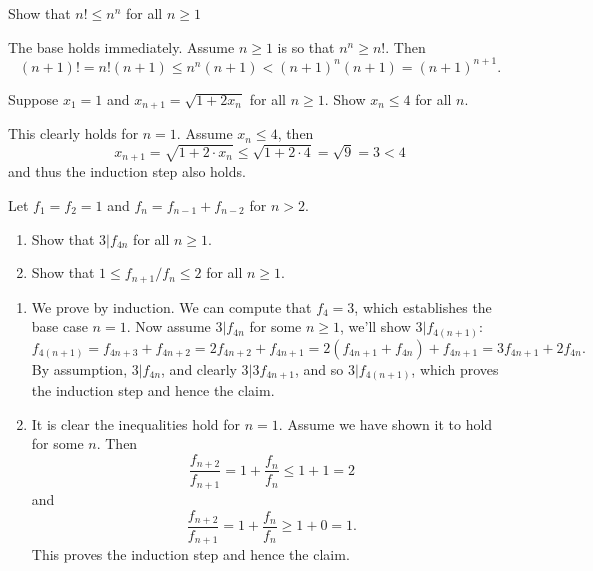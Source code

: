 \documentclass[11pt,dvipsnames]{book}
\numberwithin{equation}{section} %
\numberwithin{figure}{section} %
\numberwithin{table}{section} %
\begin{document}
\begin{exercise}
Show that $n!\leq n^{n}$ for all $n\geq 1$
\begin{solution}
The base holds immediately. Assume $n\geq 1$ is so that $n^{n}\geq n!$. Then
\[
(n+1)!=n! (n+1)\leq n^{n} (n+1)<(n+1)^{n}(n+1)=(n+1)^{n+1}.
\]
\end{solution}
\end{exercise}


\begin{exercise} Suppose $x_{1}=1$ and $x_{n+1} = \sqrt{1+2x_{n}}$ for all $n\geq 1$. Show $x_{n}\leq 4$ for all $n$. \\
\begin{solution}
This clearly holds for $n=1$. Assume $x_{n}\leq 4$, then 
\[
x_{n+1}= \sqrt{1+2\cdot x_{n}}\leq \sqrt{1+2\cdot 4}=\sqrt{9}=3<4\]
and thus the induction step also holds. 
\end{solution}
\end{exercise}

\begin{exercise}  Let $f_{1}=f_{2}=1$ and $f_{n}=f_{n-1}+f_{n-2}$ for $n>2$. 
\begin{enumerate}[label=(\alph*)]
\item Show that $3|f_{4n}$ for all $n\geq 1$. 
\item Show that $1\leq f_{n+1}/f_{n}\leq 2$ for all $n\geq 1$. 
\end{enumerate}

\begin{solution}
\begin{enumerate}[label=(\alph*)]
\item We prove by induction. We can compute that $f_{4}=3$, which establishes the base case $n=1$. Now assume $3|f_{4n}$ for some $n\geq 1$, we'll show $3|f_{4(n+1)}$:
\[
f_{4(n+1)}=f_{4n+3}+f_{4n+2}
=2f_{4n+2}+f_{4n+1}
=2(f_{4n+1}+f_{4n})+f_{4n+1}
=3f_{4n+1}+2f_{4n}.
\]
By assumption, $3|f_{4n}$, and clearly $3|3f_{4n+1}$, and so $3|f_{4(n+1)}$, which proves the induction step and hence the claim. 
\item It is clear the inequalities hold for $n=1$. Assume we have shown it to hold for some $n$. Then
\[
\frac{f_{n+2}}{f_{n+1}}=1+\frac{f_{n}}{f_{n}}\leq 1+1=2
\]
and 
\[
\frac{f_{n+2}}{f_{n+1}}=1+\frac{f_{n}}{f_{n}}\geq 1+0=1.\]
This proves the induction step and hence the claim. 
\end{enumerate}
\end{solution}
\end{exercise}
\end{document}
